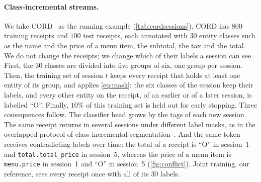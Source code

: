 \documentclass[10pt,twocolumn,letterpaper]{article}
\begin{document}
\paragraph{Class-incremental streams.} We take CORD~\citep{park2019cord} as the running example (\cref{tab:cordsessions}). CORD has $800$ training receipts and $100$ test receipts, each annotated with $30$ entity classes such as the name and the price of a menu item, the subtotal, the tax and the total. We do not change the receipts; we change which of their labels a session can see. First, the $30$ classes are divided into five groups of six, one group per session. Then, the training set of session $t$ keeps every receipt that holds at least one entity of its group, and applies \cref{eq:mask}: the six classes of the session keep their labels, and every other entity on the receipt, of an earlier or of a later session, is labelled ``O''. Finally, $10\%$ of this training set is held out for early stopping. Three consequences follow. The classifier head grows by the tags of each new session. The same receipt returns in several sessions under different label masks, as in the overlapped protocol of class-incremental segmentation~\citep{cermelli2020mib}. And the same token receives contradicting labels over time: the total of a receipt is ``O'' in session~1 and \texttt{total.total\_price} in session~5, whereas the price of a menu item is \texttt{menu.price} in session~1 and ``O'' in session~5 (\cref{fig:conflict}). Joint training, our reference, sees every receipt once with all of its $30$ labels.

\begin{table}[t]
\centering\footnotesize
\setlength{\tabcolsep}{3pt}
\caption{\textbf{The five sessions of CIL-CORD.} Each session annotates six of CORD's $30$ classes; every other entity is labelled ``O''. Receipts: the CORD training receipts that hold at least one entity of the session ($800$ in all).}
\label{tab:cordsessions}
\end{table}
\end{document}
